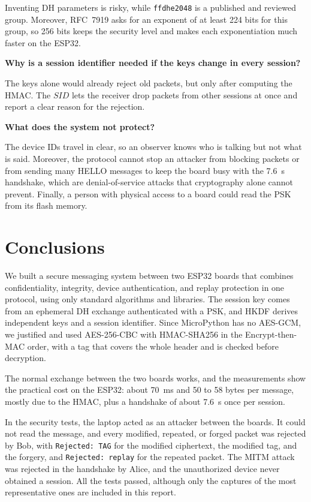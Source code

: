 \documentclass[11pt,a4paper]{article}
\begin{document}
Inventing DH parameters is risky, while \texttt{ffdhe2048} is a published and reviewed
group. Moreover, RFC~7919 asks for an exponent of at least 224 bits for this
group, so 256 bits keeps the security level and makes each exponentiation much
faster on the ESP32.

\textbf{Why is a session identifier needed if the keys change in every session?}

The keys alone would already reject old packets, but only after
computing the HMAC. The $\mathit{SID}$ lets the receiver drop packets from
other sessions at once and report a clear reason for the rejection.

\textbf{What does the system not protect?}

The device IDs travel in clear, so an observer knows who is talking but not what is said. Moreover, the
protocol cannot stop an attacker from blocking packets or from sending many
HELLO messages to keep the board busy with the 7.6~s handshake, which are
denial-of-service attacks that cryptography alone cannot prevent. Finally, a
person with physical access to a board could read the PSK from its flash
memory.


\section{Conclusions}

We built a secure messaging system between two ESP32 boards that combines
confidentiality, integrity, device authentication, and replay protection in one
protocol, using only standard algorithms and libraries. The session key comes
from an ephemeral DH exchange authenticated with a PSK, and HKDF derives
independent keys and a session identifier. Since MicroPython has no AES-GCM, we
justified and used AES-256-CBC with HMAC-SHA256 in the Encrypt-then-MAC order,
with a tag that covers the whole header and is checked before decryption.

The normal exchange between the two boards works, and the measurements show the
practical cost on the ESP32: about 70~ms and 50 to 58 bytes per message, mostly
due to the HMAC, plus a handshake of about 7.6~s once per session.

In the security tests, the laptop acted as an attacker between the boards. It
could not read the message, and every modified, repeated, or forged packet was
rejected by Bob, with \texttt{Rejected: TAG} for the modified ciphertext, the
modified tag, and the forgery, and \texttt{Rejected: replay} for the repeated
packet. The MITM attack was rejected in the handshake by Alice, and the
unauthorized device never obtained a session. All the tests passed, although only
the captures of the most representative ones are included in this report.
\end{document}
